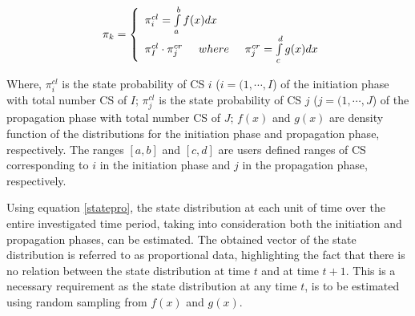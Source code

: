 \documentclass[Journal]{ascelike}
\begin{document}
% 
\begin{eqnarray}
 &  & {\pi_{k}}=\left\{ {\begin{array}{l}
{\pi_{i}^{cl}=\int\limits _{a}^{b}{f(x)dx}}\\
{\pi_{I}^{cl}\cdot\pi_{j}^{cr}\hspace{0.5cm}where\hspace{0.5cm}\pi_{j}^{cr}=\int\limits _{c}^{d}{g(x)dx}}
\end{array}{\rm {}}}\right.\label{statepro}
\end{eqnarray}


Where, $\pi_{i}^{cl}$ is the state probability of CS $i$ ($i=(1,\cdots,I$)
of the initiation phase with total number CS of $I$; $\pi_{j}^{cl}$
is the state probability of CS $j$ ($j=(1,\cdots,J$) of the propagation
phase with total number CS of $J$; $f(x)$ and $g(x)$ are density
function of the distributions for the initiation phase and propagation
phase, respectively. The ranges $[a,b]$ and $[c,d]$ are users defined
ranges of CS corresponding to $i$ in the initiation phase and $j$
in the propagation phase, respectively.

Using equation \eqref{statepro}, the state distribution at each unit
of time over the entire investigated time period, taking into consideration
both the initiation and propagation phases, can be estimated. The
obtained vector of the state distribution is referred to as proportional
data, highlighting the fact that there is no relation between the
state distribution at time $t$ and at time $t+1$. This is a necessary
requirement as the state distribution at any time $t$, is to be estimated
using random sampling from $f(x)$ and $g(x)$.
\end{document}
